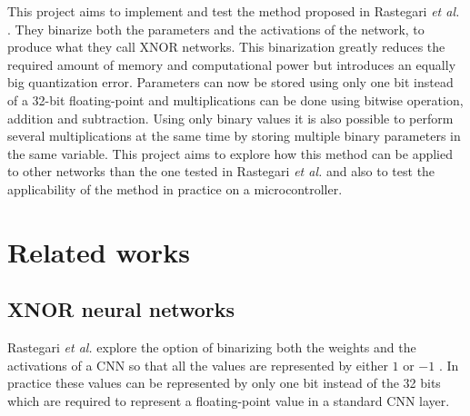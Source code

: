 \documentclass[conference]{IEEEtran}
\begin{document}
This project aims to implement and test the method proposed in Rastegari \textit{et al.} \cite{xnor}. They binarize both the parameters and the activations of the network, to produce what they call XNOR networks. This binarization greatly reduces the required amount of memory and computational power but introduces an equally big quantization error. Parameters can now be stored using only one bit instead of a 32-bit floating-point and multiplications can be done using bitwise operation, addition and subtraction. Using only binary values it is also possible to perform several multiplications at the same time by storing multiple binary parameters in the same variable. This project aims to explore how this method can be applied to other networks than the one tested in Rastegari \textit{et al.} \cite{xnor} and also to test the applicability of the method in practice on a microcontroller.

\section{Related works}

\subsection{XNOR neural networks}
Rastegari \textit{et al.} explore the option of binarizing both the weights and the activations of a CNN so that all the values are represented by either $1$ or $-1$ \cite{xnor}. In practice these values can be represented by only one bit instead of the 32 bits which are required to represent a floating-point value in a standard CNN layer.
\end{document}
